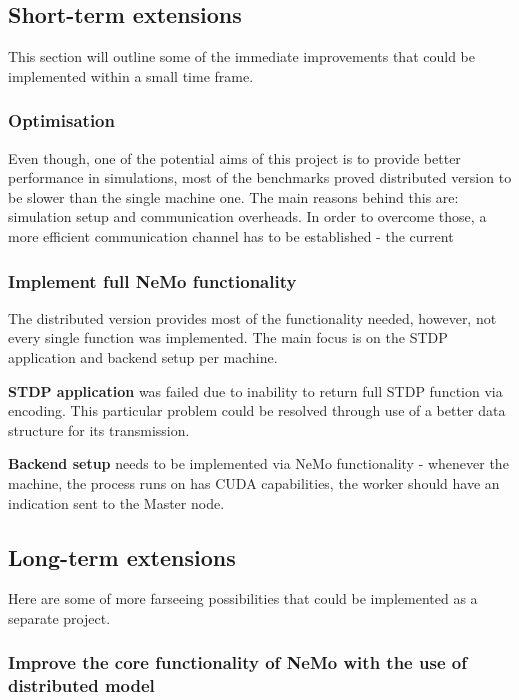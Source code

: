 \subsection{Short-term extensions}

This section will outline some of the immediate improvements that could be implemented within a small time frame.

\subsubsection{Optimisation}

Even though, one of the potential aims of this project is to provide better performance in simulations, most of the benchmarks proved distributed version to be slower than the single machine one. The main reasons behind this are: simulation setup and communication overheads. In order to overcome those, a more efficient communication channel has to be established - the current  

\subsubsection{Implement full NeMo functionality}

The distributed version provides most of the functionality needed, however, not every single function was implemented. The main focus is on the STDP application and backend setup per machine.

\textbf{STDP application} was failed due to inability to return full STDP function via encoding. This particular problem could be resolved through use of a better data structure for its transmission.

\textbf{Backend setup} needs to be implemented via NeMo functionality - whenever the machine, the process runs on has CUDA capabilities, the worker should have an indication sent to the Master node.

\subsection{Long-term extensions}

Here are some of more farseeing possibilities that could be implemented as a separate project.

\subsubsection{Improve the core functionality of NeMo with the use of distributed model}

